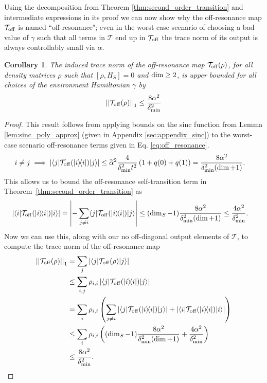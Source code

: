 \documentclass[
 amsmath,amssymb,
 aps,
onecolumn, 
nofootinbib]{revtex4-2}
\newtheorem{corollary}[theorem]{Corollary}
\newcommand{\off}{\rm off}
\newcommand{\ket}[1]{|#1\rangle}
\newcommand{\bra}[1]{\langle #1|}
\newcommand{\ketbra}[2]{| #1\rangle\! \langle #2|}
\newcommand{\abs}[1]{\left| #1 \right|}
\newcommand{\norm}[1]{\left|\left| #1 \right|\right|}
\begin{document}
Using the decomposition from Theorem \ref{thm:second_order_transition} and intermediate expressions in its proof we can now show why the off-resonance map $\mathcal{T}_{\off}$ is named ``off-resonance"; even in the worst case scenario of choosing a bad value of $\gamma$ such that all terms in $\mathcal{T}$ end up in $\mathcal{T}_{\off}$ the trace norm of its output is always controllably small via $\alpha$.
\begin{corollary} \label{cor:t_off_norm}
    The induced trace norm of the off-resonance map $\mathcal{T}_{\off}(\rho)$, for all density matrices $\rho$ such that $[\rho, H_S] = 0$ and $\rm{dim}\ge 2$, is upper bounded for all choices of the environment Hamiltonian $\gamma$ by
    \begin{align}
        \norm{\mathcal{T}_{\off}(\rho)}_1 \le \frac{8 \alpha^2}{\delta_{\min}^2}
    \end{align}
\end{corollary}
\begin{proof}

This result follows from applying bounds on the sinc function from Lemma \ref{lem:sinc_poly_approx} (given in Appendix \ref{sec:appendix_sinc}) to the worst-case scenario off-resonance terms given in Eq. \eqref{eq:off_resonance}. 
    \begin{align}
        i \neq j \implies \abs{\bra{j}\mathcal{T}_{\off}(\ketbra{i}{i})\ket{j}} &\le \widetilde{\alpha}^2\frac{4}{\delta_{\min}^2 t^2} \left( 1 + q(0) + q(1)\right) = \frac{8 \alpha^2}{\delta_{\min}^2(\dim + 1)}.
    \end{align}
    This allows us to bound the off-resonance self-transition term in Theorem~\ref{thm:second_order_transition} as
    \begin{align}
        \abs{\bra{i}\mathcal{T}_{\off}(\ketbra{i}{i})\ket{i}} &= \abs{- \sum_{j \neq i} \bra{j} \mathcal{T}_{\off}(\ketbra{i}{i}) \ket{j}} \le (\dim_S - 1) \frac{8 \alpha^2}{\delta_{\min}^2 (\dim + 1)} \le \frac{4 \alpha^2}{\delta_{\min}^2}.
    \end{align}
    Now we can use this, along with our no off-diagonal output elements of $\mathcal{T}$, to compute the trace norm of the off-resonance map
    \begin{align}
        \norm{\mathcal{T}_{\off}(\rho)}_1 &= \sum_{j} \abs{\bra{j} \mathcal{T}_{\off}(\rho) \ket{j}} \\
        &\le \sum_{i, j} \rho_{i,i} \abs{\bra{j}\mathcal{T}_{\off}(\ketbra{i}{i})\ket{j}} \\
        &= \sum_{i} \rho_{i,i} \left(\sum_{j \neq i} |\bra{j} \mathcal{T}_{\off}(\ketbra{i}{i}) \ket{j}| + |\bra{i} \mathcal{T}_{\off}(\ketbra{i}{i})\ket{i}| \right) \\
        &\le \sum_{i} \rho_{i,i} \left( (\dim_S - 1) \frac{8 \alpha^2}{\delta_{\min}^2(\dim + 1)} + \frac{4 \alpha^2}{\delta_{\min}^2} \right) \\
        &\le \frac{8 \alpha^2}{\delta_{\min}^2}.
    \end{align}
\end{proof}
\end{document}
